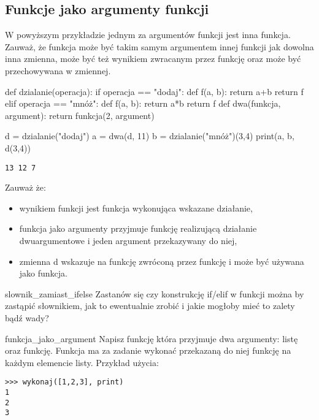 \documentclass{pdfBooklets}
\begin{document}
\subsection{Funkcje jako argumenty funkcji {\Symbola 🤔}}

W powyższym przykładzie jednym za argumentów funkcji  jest inna funkcja.
Zauważ, że funkcja może być takim samym argumentem innej funkcji jak dowolna inna zmienna,
może być też wynikiem zwracanym przez funkcję oraz może być przechowywana w zmiennej.

\begin{CodeFrame}[python]{0.50\textwidth}
def dzialanie(operacja):
    if operacja == "dodaj":
        def f(a, b):
            return a+b
        return f
    elif operacja == "mnóż":
        def f(a, b):
            return a*b
        return f
def dwa(funkcja, argument):
    return funkcja(2, argument)

d = dzialanie("dodaj")
a = dwa(d, 11)
b = dzialanie("mnóż")(3,4)
print(a, b, d(3,4))
\end{CodeFrame}
\begin{minipage}[t]{0.46\textwidth}
\begin{Verbatim}[frame=single]
13 12 7
\end{Verbatim}

\vspace{6pt}\noindent Zauważ że:
\begin{itemize}[leftmargin=7mm]
\item wynikiem funkcji  jest funkcja wykonująca wskazane działanie,
\item funkcja  jako argumenty przyjmuje funkcję realizującą działanie dwuargumentowe i jeden argument przekazywany do niej,
\item zmienna d wskazuje na funkcję zwróconą przez funkcję  i może być używana jako funkcja.
\end{itemize}
\end{minipage}

\begin{Zadanie}{}{slownik_zamiast_ifelse}
Zastanów się czy konstrukcję if/elif w funkcji  można by zastąpić słownikiem, jak to ewentualnie zrobić i jakie mogłoby mieć to zalety bądź wady?
\end{Zadanie}

\begin{Zadanie}{}{funkcja_jako_argument}
Napisz funkcję która przyjmuje dwa argumenty: listę oraz funkcję. Funkcja ma za zadanie wykonać przekazaną do niej funkcję na każdym elemencie listy. Przykład użycia:
\begin{Verbatim}
>>> wykonaj([1,2,3], print)
1
2
3
\end{Verbatim}
\end{Zadanie}
\end{document}
